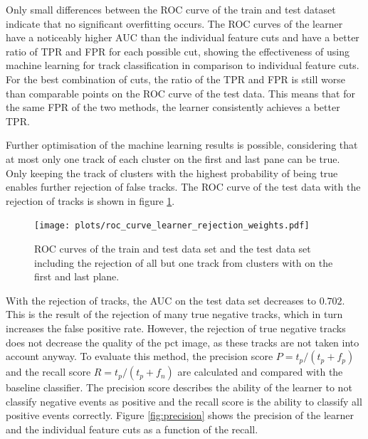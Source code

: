
Only small differences between the ROC curve of the train and test dataset indicate that no significant overfitting occurs.
The ROC curves of the learner have a noticeably higher AUC than the individual feature cuts and have a better ratio of TPR and FPR for each possible cut, showing the effectiveness
of using machine learning for track classification in comparison to individual feature cuts. For the best combination of cuts, the ratio of the TPR and FPR is still worse than
comparable points on the ROC curve of the test data. This means that for the same FPR of the two methods, the learner consistently achieves a better TPR.

Further optimisation of the machine learning results is possible, considering that at most only one track of each cluster
on the first and last pane can be true. Only keeping the track of clusters with the highest probability of being true enables further rejection of
false tracks. The ROC curve of the test data with the rejection of tracks is shown in figure \ref{fig:rejection}.


\begin{figure}
  \centering
  \texttt{[image: plots/roc\_curve\_learner\_rejection\_weights.pdf]}
  \caption{ROC curves of the train and test data set and the test data set including the rejection of all but one track from clusters with on the first and last plane.}
  \label{fig:rejection}
\end{figure}

With the rejection of tracks, the AUC on the test data set decreases to $0.702$. This is the result of the rejection of many true negative tracks, which in turn increases
the false positive rate. However, the rejection of true negative tracks does not decrease the quality of the pct image, as these tracks are not taken into account anyway.
To evaluate this method, the precision score $P=t_p/(t_p + f_p)$ and the recall score $R=t_p/(t_p + f_n)$ are calculated and compared with the baseline classifier. The precision
score describes the ability of the learner to not classify negative events as positive and the recall score is the ability to classify all positive events correctly.
Figure \ref{fig:precision} shows the precision of the learner and the individual feature cuts as a function of the recall.

